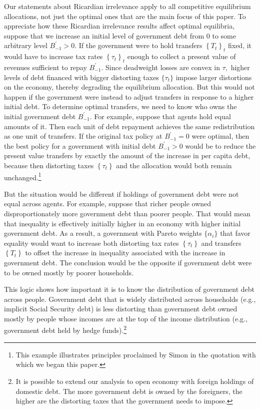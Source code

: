 \documentclass[thmsb,11pt]{article}
\begin{document}
Our statements about Ricardian irrelevance apply to all competitive equilibrium allocations,
not just the optimal ones that are the main focus of this paper.
To appreciate how  these  Ricardian irrelevance results affect optimal equilibria, suppose that we increase an
initial level of government debt from $0$ to some arbitrary level $%
B_{-1}^{\prime } > 0$. If the government were to hold transfers $\left\{ T_{t}\right\} _{t}$ fixed, it would
 have  to increase  tax rates $\left\{ \tau
_{t}\right\} _{t}$ enough to collect a present value of revenues sufficient to
repay $B_{-1}^{\prime }$. Since deadweight losses are convex in $\tau ,$
higher levels of debt financed with bigger distorting taxes $\{\tau_t\}$  impose larger
distortions on the economy, thereby degrading the equilibrium allocation.  But this would not happen  if
the government were instead  to adjust transfers in response to a higher initial debt. To determine optimal transfers, we need to
know who owns  the initial government debt $B_{-1}^{\prime }$. For example, suppose that agents hold equal amounts of it. Then
each unit of debt repayment achieves the same redistribution as one
unit of transfers. If the original tax policy  at $B_{-1}^{\prime } =0 $ were optimal, then  the best policy for a government with  initial debt $%
B_{-1}^{\prime } >0 $ would be to reduce the present value  transfers by exactly the amount of the
increase in per capita debt, because then distorting taxes $\left\{ \tau
_{t}\right\} $ and the allocation would both remain unchanged.\footnote{This example illustrates
principles proclaimed by Simon \citet[p. 85]{newcomb1865critical} in the quotation with
which we began this paper.}

But the situation would be different if  holdings of government
debt were not equal across agents. For example, suppose  that  richer people owned disproportionately more government debt
than poorer people. That would mean that inequality
is  effectively initially  higher in an economy with higher initial government debt. As a result, a
government with Pareto weights $\{\alpha_i\}$ that favor equality would want to increase both  distorting  tax rates $\left\{ \tau _{t}\right\} $
and transfers $\left\{ T_{t}\right\} $ to offset the increase in inequality
associated with the increase in government debt. The conclusion would be the
opposite if government debt were to be  owned mostly by poorer
households.



This logic shows how important it is to know the distribution of government debt across people. Government debt that is widely distributed across households
(e.g., implicit Social Security debt) is less distorting than
 government debt owned mostly by people whose incomes are at the top of the income
distribution (e.g., government debt held by hedge funds).\footnote{%
It is possible to extend our analysis to open economy with foreign
holdings of domestic debt. The more government debt is owned by the
foreigners, the higher are the distorting taxes that  the government  needs to
impose.}
\end{document}
